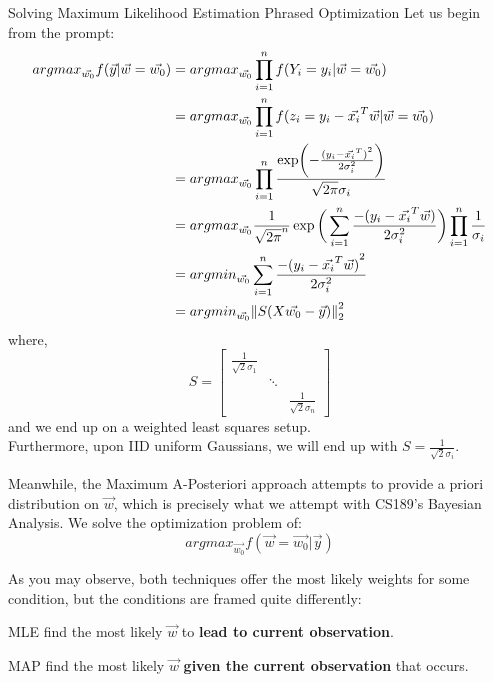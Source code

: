 \begin{ln-explain}{Solving Maximum Likelihood Estimation Phrased Optimization}{}
    Let us begin from the prompt:
    \begin{align*}
        {argmax}_{\vec{w_0}} f (\vec{y} | \vec{w} = \vec{w_0})
        &= {argmax}_{\vec{w_0}} \prod_{i = 1}^n f(Y_i = y_i | \vec{w} = \vec{w_0}) \\
        &= {argmax}_{\vec{w_0}} \prod_{i = 1}^n f(z_i = y_i - \vec{x_i}^T \vec{w} | \vec{w} = \vec{w_0}) \\
        &= {argmax}_{\vec{w_0}} \prod_{i = 1}^n \frac{\exp(-\frac{{(y_i - \vec{x_i}^T)}^2}{2\sigma_i^2})}{\sqrt{2 \pi} \sigma_i} \\
        &= {argmax}_{\vec{w_0}} \frac{1}{{\sqrt{2\pi}}^n} \exp \bigg( \sum_{i = 1}^n \frac{-(y_i - \vec{x_i}^T \vec{w})}{2 \sigma_i^2} \bigg) \prod_{i = 1}^n \frac{1}{\sigma_i} \\
        &= {argmin}_{\vec{w_0}} \sum_{i = 1}^n \frac{-{(y_i - \vec{x_i}^T \vec{w})}^2}{2 \sigma_i^2} \\
        &= {argmin}_{\vec{w_0}} \pnorm[2]{S(X \vec{w_0} - \vec{y})}{2}
    \end{align*}
    where,
    \[
        S =
        \begin{bmatrix}
            \frac{1}{\sqrt{2} \sigma_1} & & \\
            & \ddots & \\
            & & \frac{1}{\sqrt{2} \sigma_n}
        \end{bmatrix}
    \]
    and we end up on a weighted least squares setup. \\
    Furthermore, upon IID uniform Gaussians, we will end up with $S = \frac{1}{\sqrt{2} \sigma_i}$.
\end{ln-explain}

Meanwhile, the Maximum A-Posteriori approach attempts to provide a priori distribution on $\vec{w}$, which is precisely what we attempt with CS189's Bayesian Analysis.
We solve the optimization problem of:
\[
    {argmax}_{\vec{w_0}} f(\vec{w} = \vec{w_0} | \vec{y})
\]

As you may observe, both techniques offer the most likely weights for some condition, but the conditions are framed quite differently:
\begin{bindenum}
    \item MLE find the most likely $\vec{w}$ to \textbf{lead to current observation}.
    \item MAP find the most likely $\vec{w}$ \textbf{given the current observation} that occurs.
\end{bindenum}
